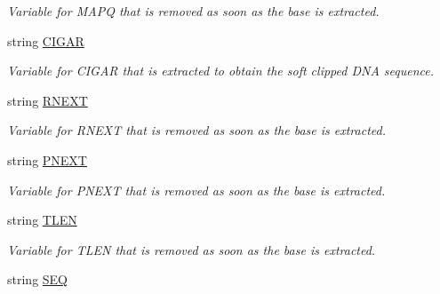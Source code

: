 \begin{DoxyCompactItemize}
\begin{DoxyCompactList}\small\item\em Variable for M\+A\+P\+Q that is removed as soon as the base is extracted. \end{DoxyCompactList}\item 
\hypertarget{class_input_s_e_q_a1448053b2ed03c56ce6afbe332b1c2b5}{string \hyperlink{class_input_s_e_q_a1448053b2ed03c56ce6afbe332b1c2b5}{C\+I\+G\+A\+R}}\label{class_input_s_e_q_a1448053b2ed03c56ce6afbe332b1c2b5}

\begin{DoxyCompactList}\small\item\em Variable for C\+I\+G\+A\+R that is extracted to obtain the soft clipped D\+N\+A sequence. \end{DoxyCompactList}\item 
\hypertarget{class_input_s_e_q_a0445211fffd6a600e8727907cdc265fe}{string \hyperlink{class_input_s_e_q_a0445211fffd6a600e8727907cdc265fe}{R\+N\+E\+X\+T}}\label{class_input_s_e_q_a0445211fffd6a600e8727907cdc265fe}

\begin{DoxyCompactList}\small\item\em Variable for R\+N\+E\+X\+T that is removed as soon as the base is extracted. \end{DoxyCompactList}\item 
\hypertarget{class_input_s_e_q_a9b90ada9d5b5f2099885cbc7ec19958b}{string \hyperlink{class_input_s_e_q_a9b90ada9d5b5f2099885cbc7ec19958b}{P\+N\+E\+X\+T}}\label{class_input_s_e_q_a9b90ada9d5b5f2099885cbc7ec19958b}

\begin{DoxyCompactList}\small\item\em Variable for P\+N\+E\+X\+T that is removed as soon as the base is extracted. \end{DoxyCompactList}\item 
\hypertarget{class_input_s_e_q_aca16efae935330460ec6148d029adaf0}{string \hyperlink{class_input_s_e_q_aca16efae935330460ec6148d029adaf0}{T\+L\+E\+N}}\label{class_input_s_e_q_aca16efae935330460ec6148d029adaf0}

\begin{DoxyCompactList}\small\item\em Variable for T\+L\+E\+N that is removed as soon as the base is extracted. \end{DoxyCompactList}\item 
\hypertarget{class_input_s_e_q_a8c70ec94582170ba2c2e99df83105c4b}{string \hyperlink{class_input_s_e_q_a8c70ec94582170ba2c2e99df83105c4b}{S\+E\+Q}}\label{class_input_s_e_q_a8c70ec94582170ba2c2e99df83105c4b}


\end{DoxyCompactItemize}
